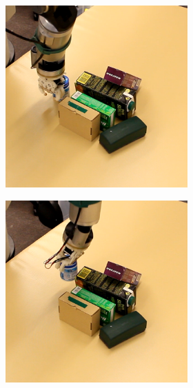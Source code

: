 \begin{figure}
\centering
\begin{subfigure}[t]{\textwidth}
\begin{subfigure}[t]{0.195\textwidth}
\centering 
\includegraphics[width=\textwidth]{Img/experiments/exp_good/action1c.png}
\end{subfigure}
\begin{subfigure}[t]{0.195\textwidth}
\centering 
\includegraphics[width=\textwidth]{Img/experiments/exp_good/action2c.png}

\end{subfigure}
\end{subfigure}
\end{figure}
